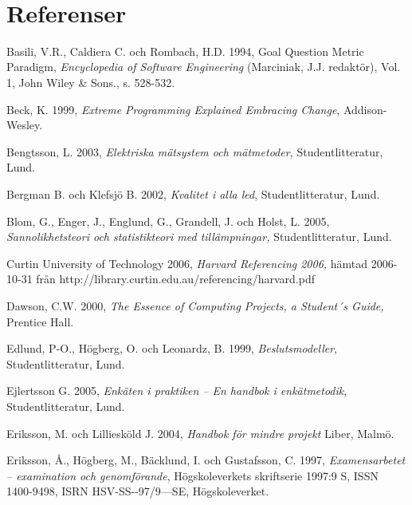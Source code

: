 \section{\texorpdfstring{\\
}{ }}\label{section}

\section{\texorpdfstring{\\
}{ }}\label{section-1}

\section{Referenser}\label{referenser}

Basili, V.R., Caldiera C. och Rombach, H.D. 1994, Goal Question Metric
Paradigm, \emph{Encyclopedia of Software Engineering} (Marciniak, J.J.
redaktör), Vol. 1, John Wiley \& Sons., s. 528-532.

Beck, K. 1999, \emph{Extreme Programming Explained Embracing Change},
Addison-Wesley.

Bengtsson, L. 2003, \emph{Elektriska mätsystem och mätmetoder,}
Studentlitteratur, Lund.

Bergman B. och Klefsjö B. 2002, \emph{Kvalitet i alla led},
Studentlitteratur, Lund.

Blom, G., Enger, J., Englund, G., Grandell, J. och Holst, L. 2005,
\emph{Sannolikhetsteori och statistikteori med tillämpningar,}
Studentlitteratur, Lund.

Curtin University of Technology 2006, \emph{Harvard Referencing 2006,}
hämtad 2006-10-31 från
http://library.curtin.edu.au/referencing/harvard.pdf

Dawson, C.W. 2000, \emph{The Essence of Computing Projects, a Student´s
Guide,} Prentice Hall.

Edlund, P-O., Högberg, O. och Leonardz, B. 1999, \emph{Beslutsmodeller},
Studentlitteratur, Lund.

Ejlertsson G. 2005, \emph{Enkäten i praktiken -- En handbok i
enkätmetodik}, Studentlitteratur, Lund.

Eriksson, M. och Lilliesköld J. 2004, \emph{Handbok för mindre projekt}
Liber, Malmö.

Eriksson, Å., Högberg, M., Bäcklund, I. och Gustafsson, C. 1997,
\emph{Examensarbetet -- examination och genomförande}, Högskoleverkets
skriftserie 1997:9 S, ISSN 1400-9498, ISRN HSV-SS-\/-97/9---SE,
Högskoleverket.

